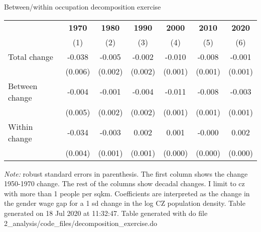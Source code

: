 \begin{center}
\begin{threeparttable}[!h]
\caption{Between/within occupation decomposition exercise}
\begin{tabular}{lcccccc}
\toprule
\toprule
&\multicolumn{1}{c}{\textbf{1970}}&\multicolumn{1}{c}{\textbf{1980}}&\multicolumn{1}{c}{\textbf{1990}}&\multicolumn{1}{c}{\textbf{2000}}&\multicolumn{1}{c}{\textbf{2010}}&\multicolumn{1}{c}{\textbf{2020}} \\
\textbf{}&\multicolumn{1}{c}{(1)}&\multicolumn{1}{c}{(2)}&\multicolumn{1}{c}{(3)}&\multicolumn{1}{c}{(4)}&\multicolumn{1}{c}{(5)}&\multicolumn{1}{c}{(6)} \\
\midrule
Total change        &      -0.038\sym{***}&      -0.005\sym{*}  &      -0.002         &      -0.010\sym{***}&      -0.008\sym{***}&      -0.001         \\
                    &     (0.006)         &     (0.002)         &     (0.002)         &     (0.001)         &     (0.001)         &     (0.001)         \\
Between change      &      -0.004         &      -0.001         &      -0.004\sym{**} &      -0.011\sym{***}&      -0.008\sym{***}&      -0.003\sym{**} \\
                    &     (0.005)         &     (0.002)         &     (0.002)         &     (0.001)         &     (0.001)         &     (0.001)         \\
Within change       &      -0.034\sym{***}&      -0.003\sym{***}&       0.002\sym{***}&       0.001\sym{**} &      -0.000         &       0.002\sym{***}\\
                    &     (0.004)         &     (0.001)         &     (0.001)         &     (0.000)         &     (0.000)         &     (0.000)         \\
\bottomrule
\bottomrule
\end{tabular}
\begin{tablenotes}
\item \footnotesize \textit{Note:} robust standard errors in parenthesis. The first column shows the change 1950-1970 change. The rest of the columns show decadal changes. I limit to cz with more than 1 people per sqkm. Coefficients are interpreted as the change in the gender wage gap for a 1 sd change in the log CZ population density. Table generated on 18 Jul 2020 at 11:32:47. Table generated with do file 2\_analysis/code\_files/decomposition\_exercise.do
\end{tablenotes}
\end{threeparttable}
\end{center}
